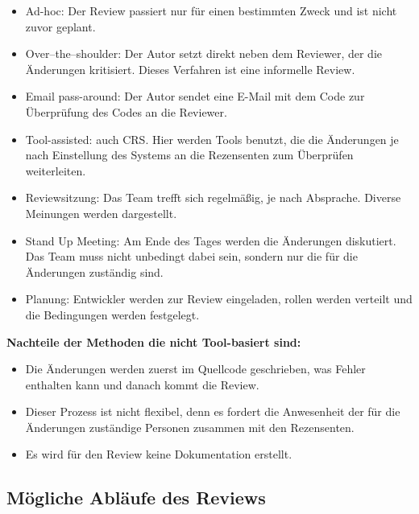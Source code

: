 \begin{itemize}
	\item Ad-hoc: Der Review passiert nur für einen bestimmten Zweck und ist nicht zuvor geplant.
	\item Over–the–shoulder: Der Autor setzt direkt neben dem Reviewer, der die Änderungen kritisiert. Dieses Verfahren ist eine informelle Review.
	\item Email pass-around: Der Autor sendet eine E-Mail mit dem Code zur Überprüfung des Codes an die Reviewer.
	\item Tool-assisted: auch \ac{CRS}. Hier werden Tools benutzt, die die Änderungen je nach Einstellung des Systems an die Rezensenten zum Überprüfen weiterleiten.
	\item Reviewsitzung: Das Team trefft sich regelmäßig, je nach Absprache. Diverse Meinungen werden dargestellt.
	\item Stand Up Meeting: Am Ende des Tages werden die Änderungen diskutiert. Das Team muss nicht unbedingt dabei sein, sondern nur die für die Änderungen zuständig sind.
	\item Planung: Entwickler werden zur Review eingeladen, rollen werden verteilt und die Bedingungen werden festgelegt.
\end{itemize}

\textbf{Nachteile der Methoden die nicht Tool-basiert sind:}
\begin{itemize}
	\item Die Änderungen werden zuerst im Quellcode geschrieben, was Fehler enthalten kann und danach kommt die Review.
	\item Dieser Prozess ist nicht flexibel, denn es fordert die Anwesenheit der für die Änderungen zuständige Personen zusammen mit den Rezensenten.
	\item Es wird für den Review keine Dokumentation erstellt.
\end{itemize}

\subsection{Mögliche Abläufe des Reviews}
\label{sec:review abläufe}

